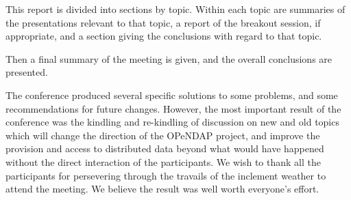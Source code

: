 This report is divided into sections by topic.  Within each topic
are summaries of the presentations relevant to that topic,
a report of the breakout session, if appropriate, and a section
giving the conclusions with regard to that topic.

Then a final summary of the meeting is given, and the overall
conclusions are presented.

The conference produced several specific solutions to some problems,
and some recommendations for future changes.  However, the most
important result of the conference was the kindling and re-kindling of
discussion on new and old topics which will change the direction of
the \ac{OPeNDAP} project, and improve the provision and access to
distributed data beyond what would have happened without the direct
interaction of the participants.  We wish to thank all the
participants for persevering through the travails of the inclement
weather to attend the meeting.  We believe the result was well worth
everyone's effort.




%
%
%
%
%

